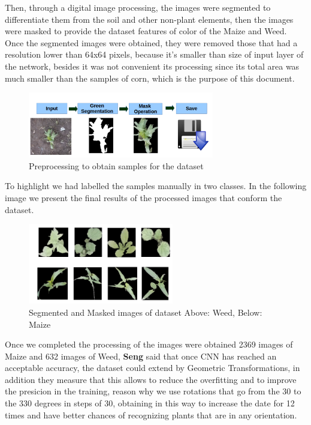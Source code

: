 \documentclass[conference]{IEEEtran}
\begin{document}
Then, through a digital image processing, the images were segmented to differentiate them from the soil and other non-plant elements, then the images were masked to provide the dataset features of color of the Maize and Weed. Once the segmented images were obtained, they were removed those that had a resolution lower than 64x64 pixels, because it's smaller than size of input layer of the network, besides it was not convenient its processing since its total area was much smaller than the samples of corn, which is the purpose of this document.\\
	\begin{figure}[h]
	\centering
	\includegraphics[width=3.2in]{procesamiento}
	\caption{Preprocessing to obtain samples for the dataset}
	\label{fig_sim}
	\end{figure}
	
To highlight we had labelled the samples manually in two classes. In the following image we present the final results of the processed images that conform the dataset.\\
	
	\begin{figure}[h]
	\centering
	\includegraphics[width=2.5in]{im1}
	\caption{ Segmented and Masked images of dataset Above: Weed, Below: Maize}
	\label{fig_sim}
	\end{figure}
	
Once we completed the processing of the images were obtained 2369 images of Maize and 632 images of Weed, \textbf{Seng} \cite{SengChang} said that once CNN has reached an acceptable accuracy, the dataset could extend by Geometric Transformations, in addition \cite{Sladojevic}  they measure that this allows to reduce the overfitting and to improve the presicion in the training, reason why we use rotations that go from the 30 to the 330 degrees in steps of 30, obtaining in this way to increase the date for 12 times and have better chances of recognizing plants that are in any orientation. \\
\end{document}
